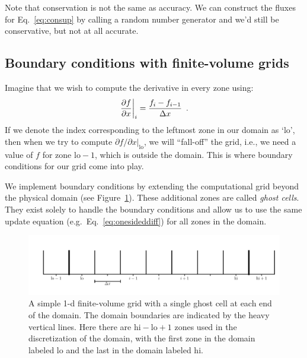 Note that conservation is not the same as accuracy.  We can construct the
fluxes for Eq.~\ref{eq:consup} by calling a random number generator and we'd
still be conservative, but not at all accurate.

\subsection{Boundary conditions with finite-volume grids}

Imagine that we wish to compute the derivative in every zone using:
\begin{equation}
\left . \frac{\partial f}{\partial x} \right |_i = \frac{f_i - f_{i-1}}{\Delta x} \enskip .
\label{eq:onesideddiff}
\end{equation}
If we denote the index corresponding to the leftmost zone in our
domain as `lo', then when we try to compute ${\partial f}/{\partial x}
|_\mathrm{lo}$, we will ``fall-off'' the grid, i.e., we need a value
of $f$ for zone $\mathrm{lo}-1$, which is outside the domain.  This is
where boundary conditions for our grid come into play.

We implement boundary conditions by extending the computational grid
beyond the physical domain (see Figure~\ref{fig:fv_gc}).  These
additional zones are called {\em ghost cells}.  They exist solely to
handle the boundary conditions and allow us to use the same update
equation (e.g.\ Eq.~\ref{eq:onesideddiff}) for all zones in the
domain.

\begin{figure}[t]
\centering
\includegraphics[width=\linewidth]{simplegrid_gc}
\caption[A simple 1-d finite-volume grid with ghost cells]
        {\label{fig:fv_gc} A simple 1-d finite-volume grid with a
          single ghost cell at each end of the domain.  The domain
          boundaries are indicated by the heavy vertical lines.  Here
          there are $\mathrm{hi}-\mathrm{lo}+1$ zones used in the
          discretization of the domain, with the first zone in the
          domain labeled $\mathrm{lo}$ and the last in the domain
          labeled $\mathrm{hi}$.}
\end{figure}

